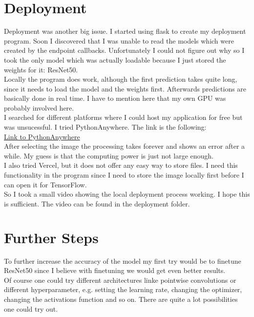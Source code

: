 \documentclass[]{article}
\begin{document}
\section{Deployment}
Deployment was another big issue. I started using flask to create my deployment program. Soon I discovered that I was unable to read the models which were created by the endpoint callbacks. Unfortunately I could not figure out why so I took the only model which was actually loadable because I just stored the weights for it: ResNet50.\\
Locally the program does work, although the first prediction takes quite long, since it needs to load the model and the weights first. Afterwards predictions are basically done in real time. I have to mention here that my own GPU was probably involved here.\\
I searched for different platforms where I could host my application for free but was unsucessful. I tried PythonAnywhere. The link is the following:\\ \href{http://minou2105.pythonanywhere.com/}{Link to PythonAnywhere}\\
After selecting the image the processing takes forever and shows an error after a while. My guess is that the computing power is just not large enough.\\
I also tried Vercel, but it does not offer any easy way to store files. I need this functionality in the program since I need to store the image locally first before I can open it for TensorFlow.\\
So I took a small video showing the local deployment process working. I hope this is sufficient. The video can be found in the deployment folder.
\section{Further Steps}
To further increase the accuracy of the model my first try would be to finetune ResNet50 since I believe with finetuning we would get even better results.\\
Of course one could try different architectures linke pointwise convolutions or different hyperparameter, e.g. setting the learning rate, changing the optimizer, changing the activations function and so on. There are quite a lot possibilities one could try out.
\end{document}
